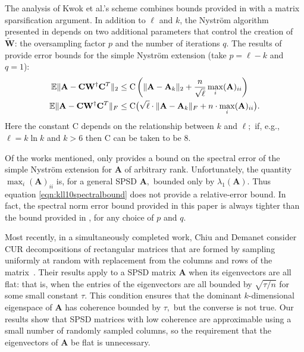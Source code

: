 \documentclass[11pt,letterpaper,twoside,reqno,nosumlimits]{amsart}
\def\pinv{\dagger}
\def\transp{T}
\newcommand{\mat}[1]{\ensuremath{\mathbf{#1}}}
\newcommand{\E}{\ensuremath{\mathbb{E}}}
\newcommand{\const}[1]{\ensuremath{\mathrm{#1}}}
\theoremstyle{remark}
\begin{document}
 The analysis of Kwok et al.'s scheme combines bounds provided in \cite{HMT11} with a matrix sparsification argument. In addition to $\ell$ and $k$, the Nystr\"om algorithm presented in \cite{KLL10} depends on two additional parameters that control the creation of $\tilde{\mat{W}}$: the oversampling factor $p$ and the number of iterations $q.$ 
The results of \cite{KLL10} provide error bounds for the simple Nystr\"om extension (take $p = \ell -k$ and $q=1$):
\begin{align}
 \E\| \mat{A} - \mat{C}\mat{W}^\pinv \mat{C}^\transp\|_2 & \leq \const{C} \left(\|\mat{A} - \mat{A}_k\|_2 + \frac{n}{\sqrt{\ell}} \max_i (\mat{A})_{ii} \right) \label{eqn:kll10spectralbound}\\
 \E\| \mat{A} - \mat{C}\mat{W}^\pinv \mat{C}^\transp\|_F & \leq \const{C} \big( \sqrt{\ell} \cdot \|\mat{A} - \mat{A}_k\|_F + n \cdot \max_i (\mat{A})_{ii} \big). \notag
\end{align}
Here the constant $\const{C}$ depends on the relationship between $k$ and $\ell;$ if, e.g., $\ell = k \ln k$ and $k > 6$ then $\const{C}$ can be taken to be 8. 

Of the works mentioned, only \cite{KLL10} provides a bound on the spectral error of the simple Nystr\"om extension for $\mat{A}$ of arbitrary rank. Unfortunately, the quantity $\max_i (\mat{A})_{ii}$ is, for a general SPSD $\mat{A},$ bounded only by $\lambda_1(\mat{A}).$ Thus equation \eqref{eqn:kll10spectralbound} does not provide a relative-error bound. In fact, the spectral norm error bound provided in this paper is always tighter than the bound provided in \cite{KLL10}, for any choice of $p$ and $q.$ 
 
Most recently, in a simultaneously completed work, Chiu and Demanet consider CUR decompositions of rectangular matrices that are formed by sampling uniformly at random with replacement from the columns and rows of the matrix~\cite{CD11}. Their results apply to a SPSD matrix $\mat{A}$ when its eigenvectors are all flat: that is, when the entries of the eigenvectors are all bounded by $\sqrt{\tau/n}$ for some small constant $\tau.$ This condition ensures that the dominant $k$-dimensional eigenspace of $\mat{A}$ has coherence bounded by $\tau,$ but the converse is not true. Our results show that SPSD matrices with low coherence are approximable using a small number of randomly sampled columns, so the requirement that the eigenvectors of $\mat{A}$ be flat is unnecessary.
\end{document}
